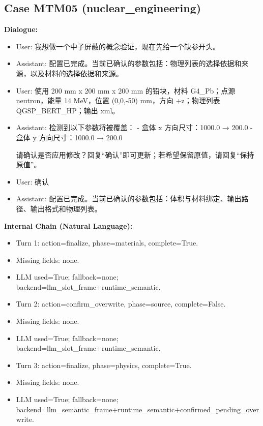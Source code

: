 \documentclass[11pt]{ctexart}
\begin{document}
\subsection{Case MTM05 (nuclear\_engineering)}
\textbf{Dialogue:}
\begin{itemize}
\item User: 我想做一个中子屏蔽的概念验证，现在先给一个缺参开头。
\item Assistant: 配置已完成。当前已确认的参数包括：物理列表的选择依据和来源，以及材料的选择依据和来源。
\item User: 使用 200 mm x 200 mm x 200 mm 的铅块，材料 G4\_Pb；点源 neutron，能量 14 MeV，位置 (0,0,-50) mm，方向 +z；物理列表 QGSP\_BERT\_HP；输出 xml。
\item Assistant: 检测到以下参数将被覆盖：
- 盒体 x 方向尺寸：1000.0 → 200.0
- 盒体 y 方向尺寸：1000.0 → 200.0

请确认是否应用修改？回复“确认”即可更新；若希望保留原值，请回复“保持原值”。
\item User: 确认
\item Assistant: 配置已完成。当前已确认的参数包括：体积与材料绑定、输出路径、输出格式和物理列表。
\end{itemize}
\textbf{Internal Chain (Natural Language):}
\begin{itemize}
\item Turn 1: action=finalize, phase=materials, complete=True.
\item Missing fields: none.
\item LLM used=True; fallback=none; backend=llm\_slot\_frame+runtime\_semantic.
\item Turn 2: action=confirm\_overwrite, phase=source, complete=False.
\item Missing fields: none.
\item LLM used=True; fallback=none; backend=llm\_slot\_frame+runtime\_semantic.
\item Turn 3: action=finalize, phase=physics, complete=True.
\item Missing fields: none.
\item LLM used=True; fallback=none; backend=llm\_semantic\_frame+runtime\_semantic+confirmed\_pending\_overwrite.
\end{itemize}
\end{document}
